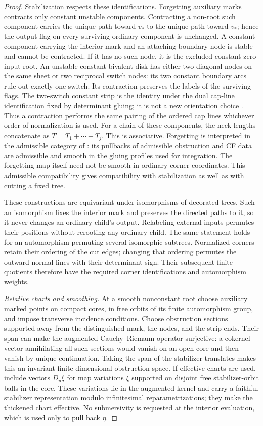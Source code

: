 \documentclass[11pt]{article}
\numberwithin{equation}{section}
\theoremstyle{definition}
\theoremstyle{remark}
\begin{document}
\begin{proof}
Stabilization respects these identifications.  Forgetting auxiliary
marks contracts only constant unstable components.  Contracting a
non-root such component carries the unique path toward $v_*$ to the
unique path toward $v_*$; hence the output flag on every surviving
ordinary component is unchanged.  A constant component carrying the
interior mark and an attaching boundary node is stable and cannot
be contracted.  If it has no such node, it is the excluded constant
zero-input root.  An unstable constant bivalent disk has either two
diagonal nodes on the same sheet or two reciprocal switch nodes:
its two constant boundary arcs rule out exactly one switch.  Its
contraction preserves the labels of the surviving flags.  The
two-switch constant strip is the identity under the dual cap-line
identification fixed by determinant gluing; it is not a new
orientation choice \cite[Sections~4.3 and~5]{Floer:AJ}.
Thus a contraction performs the same pairing
of the ordered cap lines whichever order of normalization is used.
For a chain of these components, the neck lengths concatenate as
$T=T_1+\cdots+T_j$.  This is associative.  Forgetting is interpreted
in the admissible category of \cite[Section~14.3]{Floer:AFOOO2026}:
its pullbacks of admissible obstruction and CF data are admissible
and smooth in the gluing profiles used for integration.  The
forgetting map itself need not be smooth in ordinary corner
coordinates.  This admissible compatibility gives compatibility
with stabilization as well as with cutting a fixed tree.

These constructions are equivariant under isomorphisms of decorated
trees.  Such an isomorphism fixes the interior mark and preserves
the directed paths to it, so it never changes an ordinary child's
output.  Relabeling external inputs permutes their positions without
rerooting any ordinary child.  The same statement holds for an
automorphism permuting several isomorphic subtrees.  Normalized
corners retain their ordering of the cut edges; changing that
ordering permutes the outward normal lines with their determinant
sign.  Their subsequent finite quotients therefore have the required
corner identifications and automorphism weights.

\emph{Relative charts and smoothing.}
At a smooth nonconstant root choose auxiliary marked points on
compact cores, in free orbits of its finite automorphism group,
and impose transverse incidence conditions.  Choose obstruction
sections supported away from the distinguished mark, the nodes,
and the strip ends.  Their span can make the augmented
Cauchy--Riemann operator surjective: a cokernel vector annihilating
all such sections would vanish on an open core and then vanish by
unique continuation.  Taking the span of the stabilizer translates
makes this an invariant finite-dimensional obstruction space.
If effective charts are used, include vectors $D_u\xi$ for map
variations $\xi$ supported on disjoint free stabilizer-orbit balls
in the core.  These variations lie in the augmented kernel and
carry a faithful stabilizer representation modulo infinitesimal
reparametrizations; they make the thickened chart effective.
No submersivity is requested at the interior evaluation, which is
used only to pull back $\eta$.


\end{proof}
\end{document}

